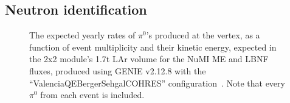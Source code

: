 \subsection{Neutron identification}

\begin{figure}[htb]
  \centering
  \caption{The expected yearly rates of $\pi^{0}$'s produced at the vertex, as a function of event multiplicity and their kinetic energy, expected in the 2x2 module's 1.7t LAr volume for the NuMI ME and LBNF fluxes, produced using GENIE v2.12.8 with the ``ValenciaQEBergerSehgalCOHRES'' configuration~\cite{genie}. Note that every $\pi^{0}$ from each event is included.}
  \label{fig:pi0_kinematics}
\end{figure}


\FloatBarrier
